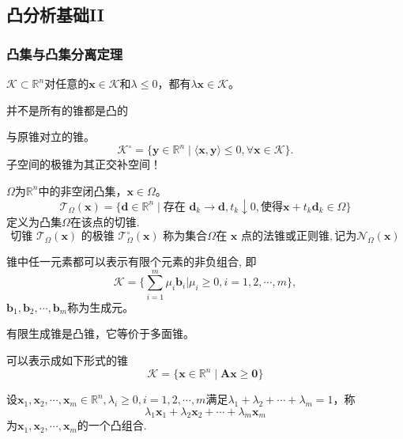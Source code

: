 \subsection{凸分析基础II}
\subsubsection{凸集与凸集分离定理}
\begin{definition}[锥]
    $\mathcal{K}\subset\mathbb{R}^n$对任意的$\boldsymbol{x}\in \mathcal{K}$和$\lambda\leqslant 0$，都有$\lambda\boldsymbol{x}\in \mathcal{K}$。

    \colorbox{red!50}{并不是所有的锥都是凸的}
\end{definition}
\begin{definition}[极锥]
    与原锥对立的锥。
    \[
        \mathcal{K}^{\circ}=\{\boldsymbol{y}\in\mathbb{R}^{n}\mid\langle \boldsymbol{x},\boldsymbol{y}\rangle\leqslant0,\forall \boldsymbol{x}\in\mathcal{K}\}.
    \]
    \colorbox{red!50}{子空间的极锥为其正交补空间！}
\end{definition}
\begin{definition}[闭凸集的切锥]
    $\Omega$为$\mathbb{R}^n$中的非空闭凸集，$\boldsymbol{x}
    \in \Omega$。
    \[
        \mathcal{T}_{\Omega}(\boldsymbol{x})=\{\boldsymbol{d}\in\mathbb{R}^{n}\mid\text{存在 }\boldsymbol{d}_{k}\rightarrow\boldsymbol{d},t_{k}\downarrow0,\text{使得}\boldsymbol{x}+t_{k}\boldsymbol{d}_{k}\in\Omega\}
    \]
    定义为凸集$\Omega$在该点的切锥.
    \[
        \text{切锥 }\mathcal{T}_\Omega(\boldsymbol{x})\text{ 的极锥 }\mathcal{T}_\Omega^\circ(\boldsymbol{x})\text{ 称为集合}\Omega\text{在 }\boldsymbol{x}\text{ 点的法锥或正则锥},\text{记为}\mathcal{N}_\Omega(\boldsymbol{x})
    \]
\end{definition}
\begin{definition}[有限生成锥]
    锥中任一元素都可以表示有限个元素的非负组合, 即
    \[
        \mathcal{K}=\Big\{\sum_{i=1}^{m}\mu_{i}\boldsymbol{b}_{i}\big|\mu_{i}\geqslant0,i=1,2,\cdots,m\Big\},
    \]
    $\boldsymbol{b}_{1},\boldsymbol{b}_{2},\cdots,\boldsymbol{b}_{m}$称为生成元。
    
    \colorbox{red!50}{有限生成锥是凸锥，它等价于多面锥。}
\end{definition}
\begin{definition}[多面锥]
    可以表示成如下形式的锥    
    \[
        \mathcal{K}=\{\boldsymbol{x}\in\mathbb{R}^n\mid\boldsymbol{Ax}\geqslant\boldsymbol{0}\}
    \]
\end{definition}
\begin{definition}[凸组合]
    设$\boldsymbol{x}_1,\boldsymbol{x}_2,\cdots,\boldsymbol{x}_m\in\mathbb{R}^n,\lambda_i\geqslant0,i=1,2,\cdots,m$满足$\lambda_{1}+\lambda_{2}+\cdots+\lambda_{m}=1$，称
    \[
        \lambda_1\boldsymbol{x}_1+\lambda_2\boldsymbol{x}_2+\cdots+\lambda_m\boldsymbol{x}_m
    \]
    为$\boldsymbol{x}_1,\boldsymbol{x}_2,\cdots,\boldsymbol{x}_m$的一个凸组合.
\end{definition}
